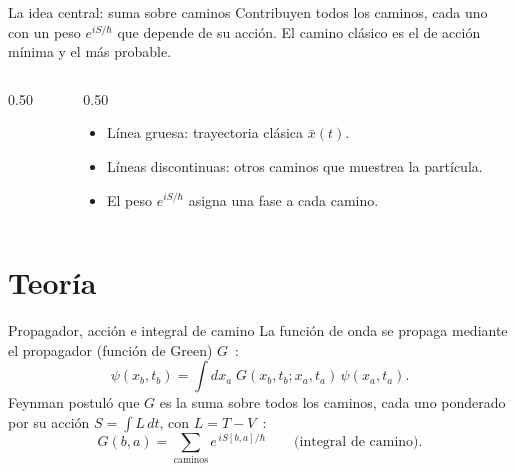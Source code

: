 \documentclass[aspectratio=169, 11pt]{beamer}
\begin{document}
\begin{frame}{La idea central: suma sobre caminos}
  \small
  Contribuyen todos los caminos, cada uno con un peso $e^{iS/\hbar}$ que depende de
  su acción. El camino clásico es el de acción mínima y el más probable.

  \vspace{0.1cm}
  \begin{columns}
    \begin{column}{0.50\textwidth}
      \centering
    \end{column}
    \begin{column}{0.50\textwidth}
      \begin{itemize}\setlength\itemsep{4pt}
        \item Línea gruesa: trayectoria clásica $\bar{x}(t)$.
        \item Líneas discontinuas: otros caminos que muestrea la partícula.
        \item El peso $e^{iS/\hbar}$ asigna una fase a cada camino.
      \end{itemize}
    \end{column}
  \end{columns}
\end{frame}

\section{Teoría}

\begin{frame}{Propagador, acción e integral de camino}
  \small
  La función de onda se propaga mediante el propagador (función de Green)
  $G$~\parencite{feynman_hibbs_1965}:
  \begin{equation*}
    \psi(x_b, t_b) = \int dx_a\; G(x_b, t_b; x_a, t_a)\, \psi(x_a, t_a).
  \end{equation*}
  Feynman postuló que $G$ es la suma sobre todos los caminos, cada uno ponderado
  por su acción $S = \int L\, dt$, con $L = T - V$~\parencite{feynman_1948}:
  \begin{equation*}
    G(b, a) = \sum_{\text{caminos}} e^{\, i S[b,a]/\hbar}
      \qquad \text{(integral de camino)}.
  \end{equation*}
\end{frame}
\end{document}
